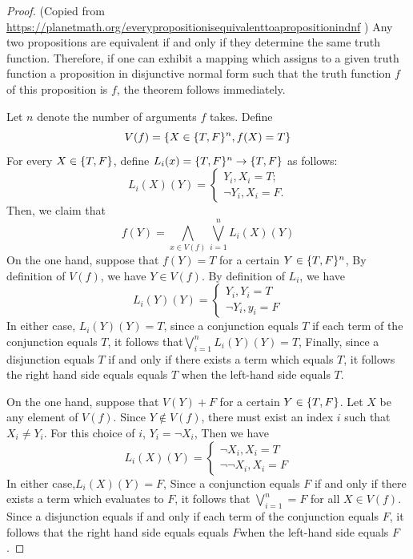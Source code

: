 \begin{proof}
	(Copied from \url{https://planetmath.org/everypropositionisequivalenttoapropositionindnf} ) Any two propositions are equivalent if and only if they determine the same truth function. Therefore, if one can exhibit a mapping which assigns to a given truth function 
 a proposition in disjunctive normal form such that the truth function $f$ of this proposition is $f$, the theorem follows immediately.

Let $n$ denote the number of arguments $f$ takes. Define
$$
V(f)=\{X\in\{T,F\}^n,f(X)=T\}
$$
For every $X\in \{T,F\}$, define $L_i (x) = \{T,F\}^n \to \{T,F\}$ as follows: 
$$
L_i (X)(Y)=  \begin{cases}
	Y_i , X_i =T;\\
	\lnot Y_i , X_i =F.
\end{cases}
$$
Then, we claim that 
$$
f(Y)=\bigwedge_{x\in V(f)}\bigvee_{i=1}^nL_i(X)(Y)
$$
On the one hand, suppose that $f(Y)=T$ for a certain $Y\in \{T,F\}^n$, By definition of $V(f)$, we have $Y\in V(f)$. By definition of $L_i$, we have
$$
L_i (Y)(Y)=\begin{cases}
	Y_i , Y_i =T\\
	\lnot Y_i, y_i = F 
\end{cases}
$$
In either case, $L_i(Y)(Y)=T$, since a conjunction equals $T$ if each term of the conjunction equals $T$, it follows that$\bigvee_{i=1}^nL_i(Y)(Y)=T$, Finally, since a disjunction equals $T$ if and only if there exists a term which equals $T$, it follows the right hand side equals equals $T$ when the left-hand side equals $T$.

On the one hand, suppose that $V(Y)+F$ for a certain $Y\in\{T,F\}$. Let $X$ be any element of $V(f)$. Since $Y \notin V(f)$, there must exist an index $i$ such that $X_i\neq Y_i$. For this choice of $i$, $Y_i =\lnot X_i $, Then we have
$$
L_i (X)(Y)=\begin{cases}
	\lnot X_i , X_i=T\\
	\lnot \lnot X_i, X_i =F
\end{cases}
$$
In either case,$L_i(X)(Y)=F$, Since a conjunction equals $F$ if and only if there exists a term which evaluates to $F$, it follows that $\bigvee_{i=1} ^n=F$ for all $X\in V(f)$. Since a disjunction equals 
 if and only if each term of the conjunction equals $F$, it follows that the right hand side equals equals $F$when the left-hand side equals $F$.

\end{proof}

